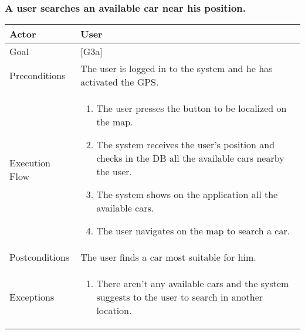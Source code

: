 \documentclass[english]{article}
\begin{document}
	\subsubsection{A user searches an available car near his position.}
	\begin{tabularx}{\textwidth}{  l  X  }
		\hline
		Actor & User\\
		\hline
		Goal & [G3a]\\
		\hline
		Preconditions & The user is logged in to the system and he has activated the GPS.\\
		\hline
		Execution Flow & \begin{enumerate}
			\item{The user presses the button to be localized on the map.}
			\item{The system receives the user's position and checks in the DB all the available cars nearby the user.}
			\item{The system shows on the application all the available cars.}
			\item{The user navigates on the map to search a car.}
		\end{enumerate}\\
		\hline
		Postconditions & The user finds a car most suitable for him.\\
		\hline
		Exceptions & \begin{enumerate}
			\item{There aren't any available cars and the system suggests to the user to search in another location.}
		\end{enumerate}\\
		\hline
	\end{tabularx}
	
\end{document}
